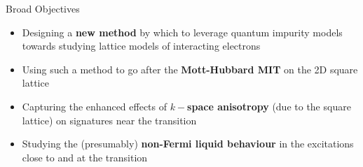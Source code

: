 \documentclass[12pt,aspectratio=169]{beamer}
\newcommand\focus[1]{%
	{\alert{\textbf{#1}}}
}
\begin{document}
\begin{frame}{Broad Objectives}

\begin{itemize}
	\item Designing a \focus{new method} by which to leverage quantum impurity models towards studying lattice models of interacting electrons\\[10pt]
	\item Using such a method to go after the \focus{Mott-Hubbard MIT} on the 2D square lattice\\[10pt]
	\item Capturing the enhanced effects of \focus{\(k-\)space anisotropy} (due to the square lattice) on signatures near the transition\\[10pt]
	\item Studying the (presumably) \focus{non-Fermi liquid behaviour} in the excitations close to and at the transition
\end{itemize}

\end{frame}
\end{document}
